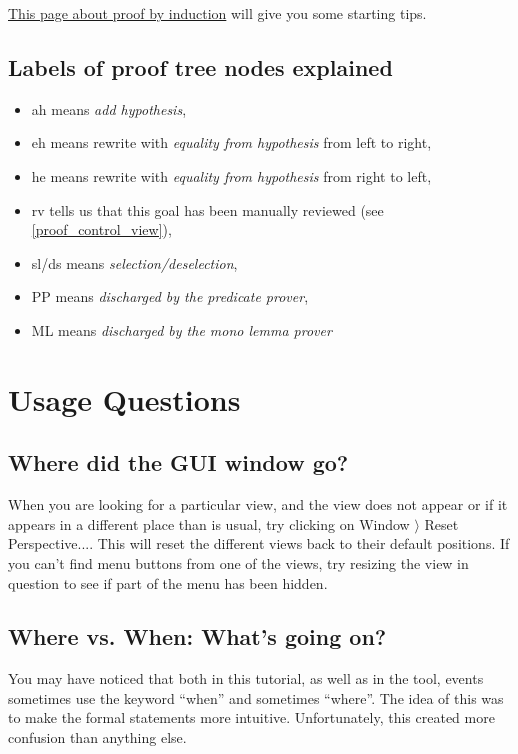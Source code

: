 \href{http://wiki.event-b.org/index.php/Induction_proof}{This page about proof by induction} will give you some starting tips.

\subsection{Labels of proof tree nodes explained}

\begin{itemize}
	\item \textsf{ah} means \textit{add hypothesis},
	\item \textsf{eh} means rewrite with \textit{equality from hypothesis} from left to right,
	\item \textsf{he} means rewrite with \textit{equality from hypothesis} from right to left,
	\item \textsf{rv} tells us that this goal has been manually reviewed (see \ref{proof_control_view}),
	\item \textsf{sl/ds} means \textit{selection/deselection},
	\item \textsf{PP} means \textit{discharged by the predicate prover},
	\item \textsf{ML} means \textit{discharged by the mono lemma prover}
\end{itemize}

\section{Usage Questions}

\subsection{Where did the GUI window go?}

When you are looking for a particular view, and the view does not appear or if it appears in a different place than is usual, try clicking on \textsf{Window $\rangle $ Reset Perspective...}. This will reset the different views back to their default positions. If you can't find menu buttons from one of the views, try resizing the view in question to see if part of the menu has been hidden.

\subsection{Where vs. When: What's going on?}

You may have noticed that both in this tutorial, as well as in the tool, events sometimes use the keyword ``when'' and sometimes ``where''.  The idea of this was to make the formal statements more intuitive.  Unfortunately, this created more confusion than anything else.

